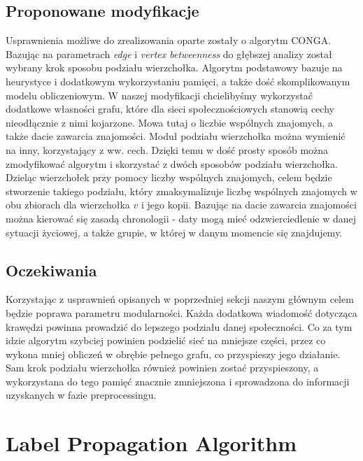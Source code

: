 \documentclass{article}
\begin{document}
\subsection{Proponowane modyfikacje}
Usprawnienia możliwe do zrealizowania oparte zostały o algorytm CONGA. Bazując na parametrach \textit{edge} i \textit{vertex betweenness} do głębszej analizy został wybrany krok sposobu podziału wierzchołka. Algorytm podstawowy bazuje na heurystyce i dodatkowym wykorzystaniu pamięci, a także dość skomplikowanym modelu obliczeniowym. W naszej modyfikacji chcielibyśmy wykorzystać dodatkowe własności grafu, które dla sieci społecznościowych stanowią cechy nieodłącznie z nimi kojarzone. Mowa tutaj o liczbie wspólnych znajomych, a także dacie zawarcia znajomości. Moduł podziału wierzchołka można wymienić na inny, korzystający z ww. cech. Dzięki temu w dość prosty sposób można zmodyfikować algorytm i skorzystać z dwóch sposobów podziału wierzchołka. Dzieląc wierzchołek przy pomocy liczby wspólnych znajomych, celem będzie stworzenie takiego podziału, który zmaksymalizuje liczbę wspólnych znajomych w obu zbiorach dla wierzchołka $v$ i jego kopii. Bazując na dacie zawarcia znajomości można kierować się zasadą chronologii - daty mogą mieć odzwierciedlenie w danej sytuacji życiowej, a także grupie, w której w danym momencie się znajdujemy.
\subsection{Oczekiwania}
Korzystając z usprawnień opisanych w poprzedniej sekcji naszym głównym celem będzie poprawa parametru modularności. Każda dodatkowa wiadomość dotycząca krawędzi powinna prowadzić do lepszego podziału danej społeczności. Co za tym idzie algorytm szybciej powinien podzielić sieć na mniejsze części, przez co wykona mniej obliczeń w obrębie pełnego grafu, co przyspieszy jego działanie. Sam krok podziału wierzchołka również powinien zostać przyspieszony, a wykorzystana do tego pamięć znacznie zmniejszona i sprowadzona do informacji uzyskanych w fazie preprocessingu.

\newpage
\section{Label Propagation Algorithm}
\end{document}
